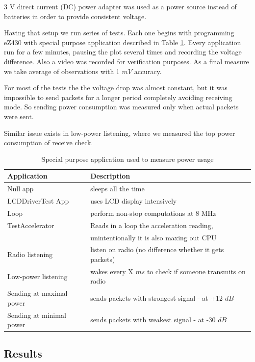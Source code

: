 3 V direct current (DC) power adapter was used as a power source instead of batteries in order to provide consistent voltage.

Having that setup we run series of tests.
Each one begins with programming eZ430 with special purpose application described in Table \ref{tab:power-apps}.
Every application run for a few minutes, pausing the plot several times and recording the voltage difference.
Also a video was recorded for verification purposes.
As a final measure we take average of observations with 1 $ mV $ accuracy.

For most of the tests the the voltage drop was almost constant, but it was impossible to send packets for a longer period completely avoiding receiving mode.
So sending power consumption was measured only when actual packets were sent.

Similar issue exists in low-power listening, where we measured the top power consumption of receive check.


\begin{table}
  \centering
    \begin{tabular}{|l|l|}
        \hline
    \textbf{Application} & \textbf{Description} \\ \hline
    Null app & sleeps all the time \\ \hline
    LCDDriverTest App & uses LCD display intensively \\ \hline
    Loop & perform non-stop computations at 8 MHz \\ \hline
    TestAccelerator & Reads in a loop the acceleration reading, \\
    & unintentionally it is also maxing out CPU \\ \hline
    Radio listening & listen on radio (no difference whether it gets packets) \\ \hline
    Low-power listening & wakes every X $ ms $ to check if someone transmits on radio \\ \hline
    Sending at maximal power & sends packets with strongest signal - at +12 $ dB $ \\ \hline
    Sending at minimal power & sends packets with weakest signal - at -30 $ dB $ \\ \hline
    \end{tabular}
  \caption{Special purpose application used to measure power usage}
  \label{tab:power-apps}
\end{table}

\subsection{Results}

